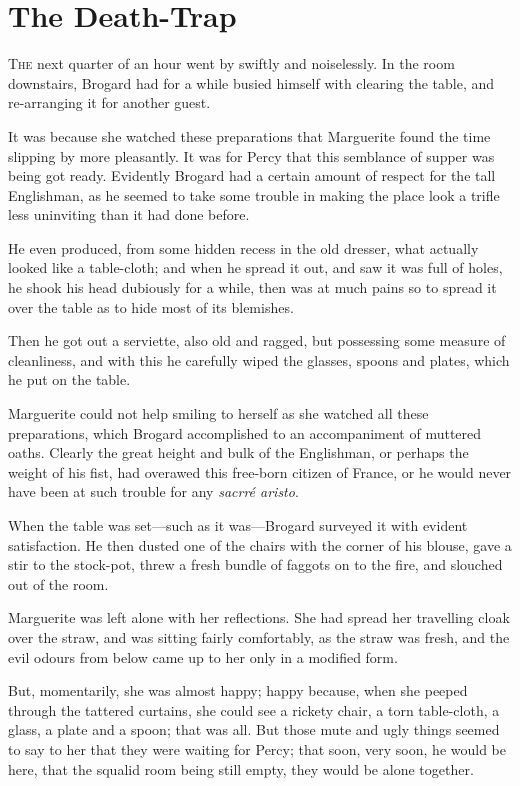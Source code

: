 
\chapter{The Death-Trap}
\lettrine[lines=4]{T}{he} next quarter of an hour went by swiftly and noiselessly. In the room downstairs, Brogard had for a while busied himself with clearing the table, and re-arranging it for another guest.

It was because she watched these preparations that Marguerite found the time slipping by more pleasantly. It was for Percy that this semblance of supper was being got ready. Evidently Brogard had a certain amount of respect for the tall Englishman, as he seemed to take some trouble in making the place look a trifle less uninviting than it had done before.

He even produced, from some hidden recess in the old dresser, what actually looked like a table-cloth; and when he spread it out, and saw it was full of holes, he shook his head dubiously for a while, then was at much pains so to spread it over the table as to hide most of its blemishes.

Then he got out a serviette, also old and ragged, but possessing some measure of cleanliness, and with this he carefully wiped the glasses, spoons and plates, which he put on the table.

Marguerite could not help smiling to herself as she watched all these preparations, which Brogard accomplished to an accompaniment of muttered oaths. Clearly the great height and bulk of the Englishman, or perhaps the weight of his fist, had overawed this free-born citizen of France, or he would never have been at such trouble for any \textit{sacrré aristo}.

When the table was set\allowbreak---\allowbreak such as it was\allowbreak---\allowbreak Brogard surveyed it with evident satisfaction. He then dusted one of the chairs with the corner of his blouse, gave a stir to the stock-pot, threw a fresh bundle of faggots on to the fire, and slouched out of the room.

Marguerite was left alone with her reflections. She had spread her travelling cloak over the straw, and was sitting fairly comfortably, as the straw was fresh, and the evil odours from below came up to her only in a modified form.

But, momentarily, she was almost happy; happy because, when she peeped through the tattered curtains, she could see a rickety chair, a torn table-cloth, a glass, a plate and a spoon; that was all. But those mute and ugly things seemed to say to her that they were waiting for Percy; that soon, very soon, he would be here, that the squalid room being still empty, they would be alone together.

